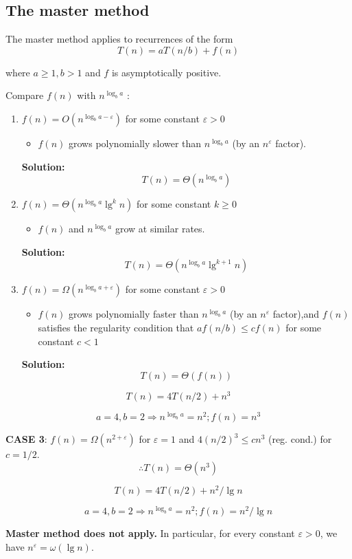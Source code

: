 \documentclass[11pt,toc=twocol]{elegantbook}
\begin{document}
\subsection{The master method}
The master method applies to recurrences of the form
$$
T(n)=a T(n / b)+f(n)
$$

where $a \geq 1, b>1$ and $f$ is asymptotically positive.
\begin{theorem}
  Compare $f(n)$ with $n^{\log _{b} a}$ :
  \begin{enumerate}
    \item $f(n)=O\left(n^{\log _{b} a-\varepsilon}\right)$ for some constant $\varepsilon>0$
    \begin{itemize}
      \item $f(n)$ grows polynomially slower than $n^{\log _{b} a}$ (by an $n^{\varepsilon}$ factor).
    \end{itemize}
    \textbf{Solution:}$$
    T(n)=\Theta\left(n^{\log _{b} a}\right)
    $$
    \item $f(n)=\Theta\left(n^{\log _{b} a} \lg ^{k} n\right)$ for some constant $k \geq 0$
    \begin{itemize}
      \item $f(n)$ and $n^{\log _{b} a}$ grow at similar rates.
    \end{itemize}
    \textbf{Solution:}
    $$
    T(n)=\Theta\left(n^{\log _{b} a} \lg ^{k+1} n\right)
    $$
    \item $f(n)=\Omega\left(n^{\log _{b} a+\varepsilon}\right)$ for some constant $\varepsilon>0$
    \begin{itemize}
      \item $f(n)$ grows polynomially faster than $n^{\log _{b} a}$ (by an $n^{\varepsilon}$ factor),and $f(n)$ satisfies the regularity condition that $a f(n / b) \leq c f(n)$ for some constant $c<1$
    \end{itemize}
    \textbf{Solution:}
    $$
    T(n)=\Theta(f(n))
    $$ 
  \end{enumerate}
\end{theorem}
\begin{example}
  $$
T(n)=4 T(n / 2)+n^{3}
$$
\end{example}
\begin{solution}
  $$a=4, b=2 \Rightarrow n^{\log _{b} a}=n^{2} ; f(n)=n^{3}$$

  \textbf{CASE 3}: $f(n)=\Omega\left(n^{2+\varepsilon}\right)$ for $\varepsilon=1$ and $4(n / 2)^{3} \leq c n^{3}$ (reg. cond.) for $c=1 / 2$.
  $$
\therefore T(n)=\Theta\left(n^{3}\right)
$$
\end{solution}
\begin{example}
  $$
  T(n)=4 T(n / 2)+n^{2} / \lg n
  $$
\end{example}
\begin{solution}
  $$a=4, b=2 \Rightarrow n^{\log _{b} a}=n^{2} ; f(n)=n^{2} / \lg n$$

  \textbf{Master method does not apply.} In particular, for every constant $\varepsilon>0$, we have $n^{\varepsilon}=\omega(\lg n)$.

\end{solution}
\end{document}

